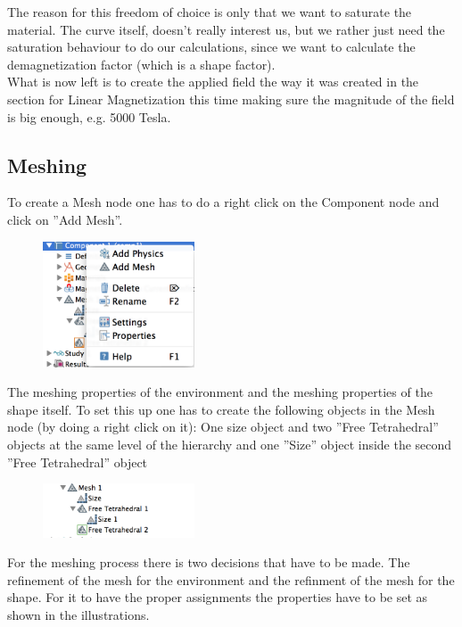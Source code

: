 The reason for this freedom of choice is only that we want to saturate the material. The curve itself, doesn't really interest us, but we rather just need the saturation behaviour to do our calculations, since we want to calculate the demagnetization factor (which is a shape factor).\\

What is now left is to create the applied field the way it was created in the section for Linear Magnetization this time making sure the magnitude of the field is big enough, e.g. 5000 Tesla.

\subsection{Meshing}

To create a Mesh node one has to do a right click on the Component node and click on ''Add Mesh''.

 \begin{figure}[H]
	\centering
  \includegraphics[width=0.4\textwidth]{Pictures/Screenshots/Sim19.png}
\end{figure} 

 The meshing properties of the environment and the meshing properties of the shape itself. To set this up one has to create the following objects in the Mesh node (by doing a right click on it): One size object and two ''Free Tetrahedral'' objects at the same level of the hierarchy and one ''Size'' object inside the second ''Free Tetrahedral'' object

 \begin{figure}[H]
	\centering
  \includegraphics[width=0.4\textwidth]{Pictures/Screenshots/Sim20.png}
\end{figure} 

For the meshing process there is two decisions that have to be made. The refinement of the mesh for the environment and the refinment of the mesh for the shape. For it to have the proper assignments the properties have to be set as shown in the illustrations. \\


